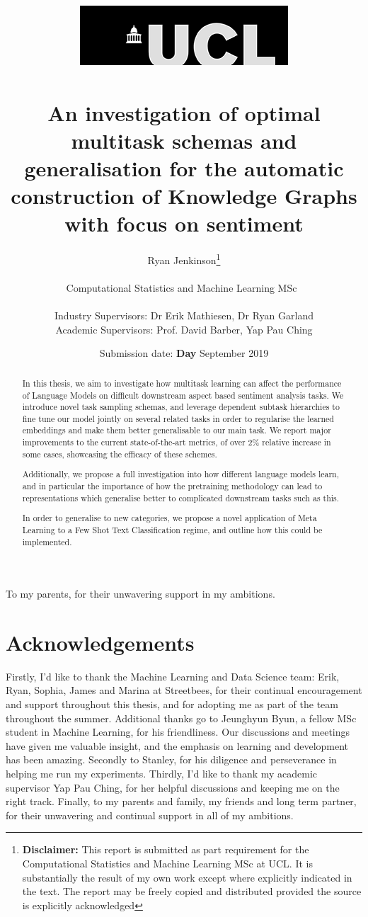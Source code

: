 \documentclass[11pt]{report}
\title{  	{ \includegraphics[scale=.5]{ucl_logo.png}}\\
{{\Huge \thesistitle}}\\
{\large An investigation of optimal multitask schemas and generalisation for the automatic construction of Knowledge Graphs with focus on sentiment}\\
		}
\date{Submission date: \textbf{Day} September 2019}
\author{Ryan Jenkinson\thanks{
{\bf Disclaimer:}
This report is submitted as part requirement for the Computational Statistics and Machine Learning MSc at UCL. It is substantially the result of my own work except where explicitly indicated in the text. The report may be freely copied and distributed provided the source is explicitly acknowledged}
\\ \\
Computational Statistics and Machine Learning MSc\ \\ \\
Industry Supervisors: Dr Erik Mathiesen, Dr Ryan Garland \\
Academic Supervisors: Prof. David Barber, Yap Pau Ching
}
\theoremstyle{Definition}
\theoremstyle{remark}
\begin{document}
\onehalfspacing
\maketitle



\null{}
\begin{flushright}
	To my parents, for their unwavering support in my ambitions.
\end{flushright}
\null
\thispagestyle{empty}
\newpage

\chapter*{Acknowledgements}
Firstly, I'd like to thank the Machine Learning and Data Science team: Erik, Ryan, Sophia, James and Marina at Streetbees, for their continual encouragement and support throughout this thesis, and for adopting me as part of the team throughout the summer. Additional thanks go to Jeunghyun Byun, a fellow MSc student in Machine Learning, for his friendliness. Our discussions and meetings have given me valuable insight, and the emphasis on learning and development has been amazing. Secondly to Stanley, for his diligence and perseverance in helping me run my experiments. Thirdly, I'd like to thank my academic supervisor Yap Pau Ching, for her helpful discussions and keeping me on the right track. Finally, to my parents and family, my friends and long term partner, for their unwavering and continual support in all of my ambitions.

\newpage
\begin{abstract}
In this thesis, we aim to investigate how multitask learning can affect the performance of Language Models on difficult downstream aspect based sentiment analysis tasks. We introduce novel task sampling schemas, and leverage dependent subtask hierarchies to fine tune our model jointly on several related tasks in order to regularise the learned embeddings and make them better generalisable to our main task. We report major improvements to the current state-of-the-art metrics, of over 2\% relative increase in some cases, showcasing the efficacy of these schemes. 

Additionally, we propose a full investigation into how different language models learn, and in particular the importance of how the pretraining methodology can lead to representations which generalise better to complicated downstream tasks such as this.

In order to generalise to new categories, we propose a novel application of Meta Learning to a Few Shot Text Classification regime, and outline how this could be implemented.
\end{abstract}
\newpage 
\end{document}

